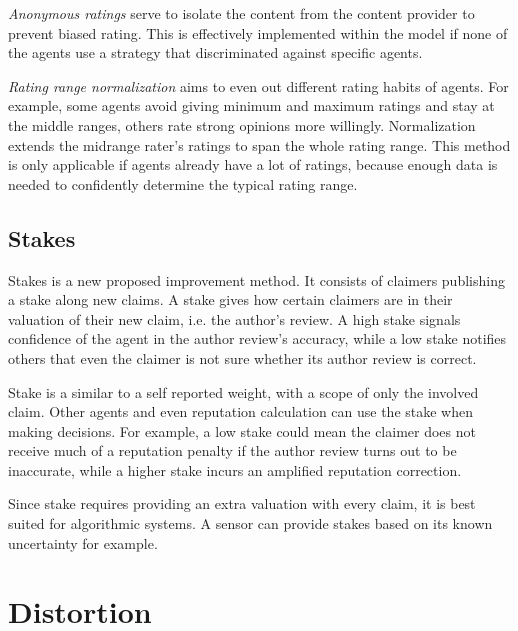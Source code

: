 \documentclass[%
    ]{\PathToTumTemplate/thesis/tum_thesis}
\begin{document}
\emph{Anonymous ratings} serve to isolate the content from the content provider to prevent biased rating.
This is effectively implemented within the model if none of the agents use a strategy that discriminated against specific agents.

\emph{Rating range normalization} aims to even out different rating habits of agents.
For example, some agents avoid giving minimum and maximum ratings and stay at the middle ranges, others rate strong opinions more willingly.
Normalization extends the midrange rater's ratings to span the whole rating range.
This method is only applicable if agents already have a lot of ratings, because enough data is needed to confidently determine the typical rating range.


\subsection{Stakes}

Stakes is a new proposed improvement method.
It consists of claimers publishing a stake along new claims.
A stake gives how certain claimers are in their valuation of their new claim, i.e. the author's review.
A high stake signals confidence of the agent in the author review's accuracy, while a low stake notifies others that even the claimer is not sure whether its author review is correct.

Stake is a similar to a self reported weight, with a scope of only the involved claim.
Other agents and even reputation calculation can use the stake when making decisions.
For example, a low stake could mean the claimer does not receive much of a reputation penalty if the author review turns out to be inaccurate, while a higher stake incurs an amplified reputation correction.

Since stake requires providing an extra valuation with every claim, it is best suited for algorithmic systems.
A sensor can provide stakes based on its known uncertainty for example.



\section{Distortion}\label{sec:distort_strategies}
\end{document}
